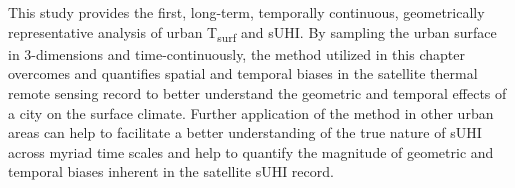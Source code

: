 This study provides the first, long-term, temporally continuous, geometrically representative analysis of urban T\textsubscript{surf} and sUHI. By sampling the urban surface in 3-dimensions and time-continuously, the method utilized in this chapter overcomes and quantifies spatial and temporal biases in the satellite thermal remote sensing record to better understand the geometric and temporal effects of a city on the surface climate. Further application of the method in other urban areas can help to facilitate a better understanding of the true nature of sUHI across myriad time scales and help to quantify the magnitude of geometric and temporal biases inherent in the satellite sUHI record.
